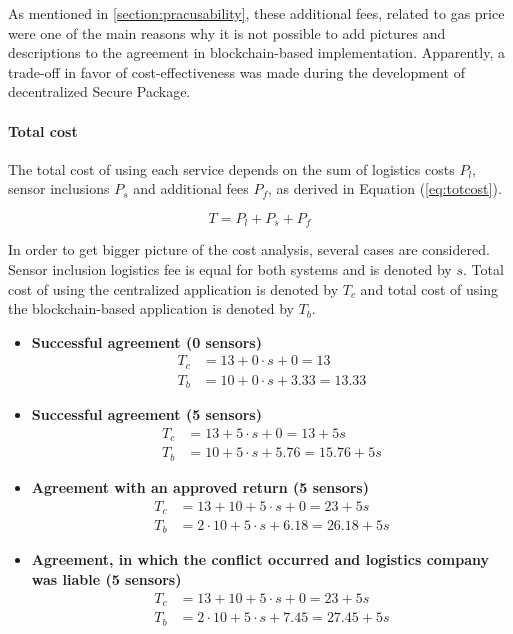 As mentioned in \ref{section:pracusability}, these additional fees, related to gas price were one of the main reasons why it is not possible to add pictures and descriptions to the agreement in blockchain-based implementation. Apparently, a trade-off in favor of cost-effectiveness was made during the development of decentralized Secure Package.

\paragraph{Total cost}
The total cost of using each service depends on the sum of logistics costs $P_l$, sensor inclusions $P_s$ and additional fees $P_f$, as derived in Equation (\ref{eq:totcost}). 

\begin{equation} \label{eq:totcost}
T = P_l + P_s + P_f
\end{equation}

In order to get bigger picture of the cost analysis, several cases are considered. Sensor inclusion logistics fee is equal for both systems and is denoted by $s$. Total cost of using the centralized application is denoted by $T_c$ and total cost of using the blockchain-based application is denoted by $T_b$.

\begin{itemize}
\item \textbf{Successful agreement (0 sensors)}
\begin{align*}
T_c &= 13 + 0 \cdot s + 0 = 13\\
T_b &= 10 + 0 \cdot s + 3.33 = 13.33
\end{align*}
\item \textbf{Successful agreement (5 sensors)}
\begin{align*}
T_c &= 13 + 5 \cdot s + 0 = 13 + 5s\\
T_b &= 10 + 5 \cdot s + 5.76 = 15.76 + 5s
\end{align*}
\item \textbf{Agreement with an approved return (5 sensors)}
\begin{align*}
T_c &= 13 + 10 + 5 \cdot s + 0 = 23 + 5s\\
T_b &= 2 \cdot 10 + 5 \cdot s + 6.18 = 26.18 + 5s
\end{align*}
\item \textbf{Agreement, in which the conflict occurred and logistics company was liable (5 sensors)}
\begin{align*}
T_c &= 13 + 10 + 5 \cdot s + 0 = 23 + 5s\\
T_b &= 2 \cdot 10 + 5 \cdot s + 7.45 = 27.45 + 5s
\end{align*}
\end{itemize}

